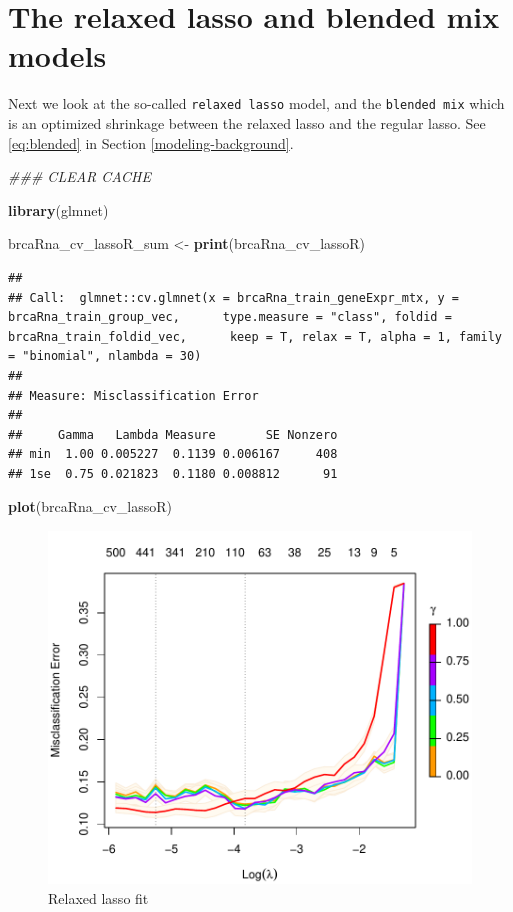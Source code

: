 \documentclass[
]{book}
\newenvironment{Shaded}{\begin{snugshade}}{\end{snugshade}}
\newcommand{\CommentTok}[1]{\textcolor[rgb]{0.56,0.35,0.01}{\textit{#1}}}
\newcommand{\KeywordTok}[1]{\textcolor[rgb]{0.13,0.29,0.53}{\textbf{#1}}}
\newcommand{\NormalTok}[1]{#1}
\newcommand{\StringTok}[1]{\textcolor[rgb]{0.31,0.60,0.02}{#1}}
\begin{document}
\hypertarget{the-relaxed-lasso-and-blended-mix-models-1}{%
\section{The relaxed lasso and blended mix models}\label{the-relaxed-lasso-and-blended-mix-models-1}}

Next we look at the so-called \texttt{relaxed\ lasso} model, and
the \texttt{blended\ mix} which is an optimized shrinkage
between the relaxed lasso and the regular lasso.
See \eqref{eq:blended} in Section \ref{modeling-background}.

\begin{Shaded}
\begin{Highlighting}[]
\CommentTok{\#\#\# CLEAR CACHE}

\KeywordTok{library}\NormalTok{(glmnet)}

\NormalTok{brcaRna\_cv\_lassoR\_sum <{-}}\StringTok{ }\KeywordTok{print}\NormalTok{(brcaRna\_cv\_lassoR)}
\end{Highlighting}
\end{Shaded}

\begin{verbatim}
## 
## Call:  glmnet::cv.glmnet(x = brcaRna_train_geneExpr_mtx, y = brcaRna_train_group_vec,      type.measure = "class", foldid = brcaRna_train_foldid_vec,      keep = T, relax = T, alpha = 1, family = "binomial", nlambda = 30) 
## 
## Measure: Misclassification Error 
## 
##     Gamma   Lambda Measure       SE Nonzero
## min  1.00 0.005227  0.1139 0.006167     408
## 1se  0.75 0.021823  0.1180 0.008812      91
\end{verbatim}

\begin{Shaded}
\begin{Highlighting}[]
\KeywordTok{plot}\NormalTok{(brcaRna\_cv\_lassoR)}
\end{Highlighting}
\end{Shaded}

\begin{figure}
\centering
\includegraphics{Static/figures/brcaRna-glmnetFit-lookLassoR-1.pdf}
\caption{\label{fig:brcaRna-glmnetFit-lookLassoR}Relaxed lasso fit}
\end{figure}
\end{document}
